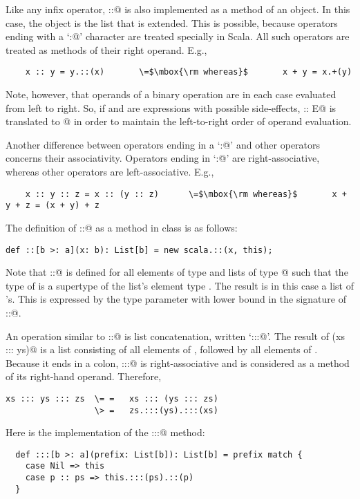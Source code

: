 \documentclass[11pt]{book}
\begin{document}
Like any infix operator, \verb@::@
is also implemented as a method of an object. In this case, the object
is the list that is extended. This is possible, because operators
ending with a `\verb@:@' character are treated specially in Scala.  
All such operators are treated as methods of their right operand. E.g.,
\begin{verbatim}
    x :: y = y.::(x)       \=$\mbox{\rm whereas}$       x + y = x.+(y)                  
\end{verbatim}
Note, however, that operands of a binary operation are in each case
evaluated from left to right.  So, if \verb@D@ and \verb@E@ are
expressions with possible side-effects, \verb@D :: E@ is translated to
@ in order to maintain the left-to-right
order of operand evaluation.

Another difference between operators ending in a `\verb@:@' and other
operators concerns their associativity.  Operators ending in
`\verb@:@' are right-associative, whereas other operators are
left-associative.  E.g.,
\begin{verbatim}
    x :: y :: z = x :: (y :: z)      \=$\mbox{\rm whereas}$       x + y + z = (x + y) + z
\end{verbatim}
The definition of \verb@::@ as a method in
class \verb@List@ is as follows:
\begin{verbatim}
def ::[b >: a](x: b): List[b] = new scala.::(x, this);
\end{verbatim}
Note that \verb@::@ is defined for all elements \verb@x@ of type
\verb@B@ and lists of type \verb@List[A]@ such that the type \verb@B@
of \verb@x@ is a supertype of the list's element type \verb@A@. The result
is in this case a list of \verb@B@'s. This
is expressed by the type parameter \verb@b@ with lower bound \verb@a@
in the signature of \verb@::@. 

An operation similar to \verb@::@ is list concatenation, written
`\verb@:::@'. The result of \verb@(xs ::: ys)@ is a list consisting of
all elements of \verb@xs@, followed by all elements of \verb@ys@.
Because it ends in a colon, \verb@:::@ is right-associative and is
considered as a method of its right-hand operand. Therefore,
\begin{verbatim}
xs ::: ys ::: zs  \= =   xs ::: (ys ::: zs)
                  \> =   zs.:::(ys).:::(xs)
\end{verbatim}
Here is the implementation of the \verb@:::@ method:
\begin{verbatim}
  def :::[b >: a](prefix: List[b]): List[b] = prefix match {
    case Nil => this
    case p :: ps => this.:::(ps).::(p)
  }
\end{verbatim}
\end{document}

